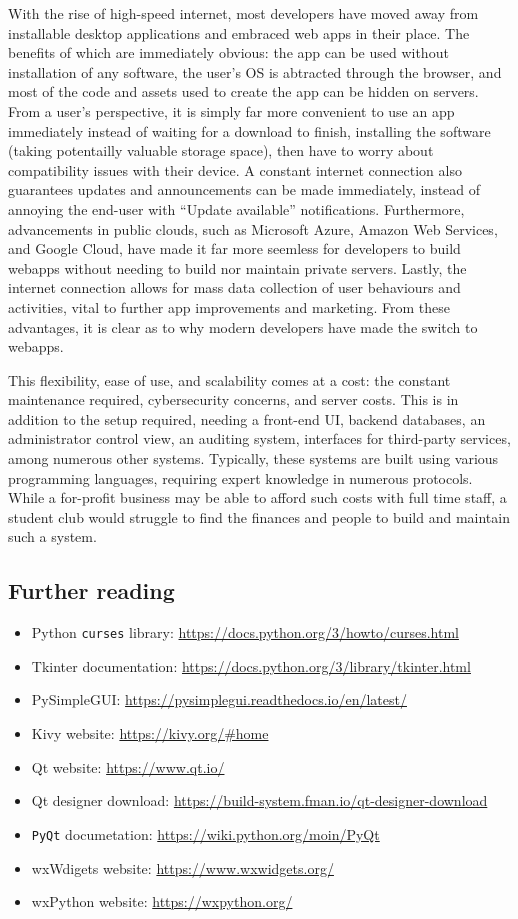 \documentclass[11pt]{article}
\begin{document}
With the rise of high-speed internet, most developers have moved away from installable desktop applications and embraced web apps in their place. The benefits of which are immediately obvious: the app can be used without installation of any software, the user's OS is abtracted through the browser, and most of the code and assets used to create the app can be hidden on servers. From a user's perspective, it is simply far more convenient to use an app immediately instead of waiting for a download to finish, installing the software (taking potentailly valuable storage space), then have to worry about compatibility issues with their device. A constant internet connection also guarantees updates and announcements can be made immediately, instead of annoying the end-user with ``Update available'' notifications. Furthermore, advancements in public clouds, such as Microsoft Azure, Amazon Web Services, and Google Cloud, have made it far more seemless for developers to build webapps without needing to build nor maintain private servers. Lastly, the internet connection allows for mass data collection of user behaviours and activities, vital to further app improvements and marketing. From these advantages, it is clear as to why modern developers have made the switch to webapps.

This flexibility, ease of use, and scalability comes at a cost: the constant maintenance required, cybersecurity concerns, and server costs. This is in addition to the setup required, needing a front-end UI, backend databases, an administrator control view, an auditing system, interfaces for third-party services, among numerous other systems. Typically, these systems are built using various programming languages, requiring expert knowledge in numerous protocols. While a for-profit business may be able to afford such costs with full time staff, a student club would struggle to find the finances and people to build and maintain such a system.

\subsection{Further reading}

\begin{itemize}
    \item Python \texttt{curses} library: \url{https://docs.python.org/3/howto/curses.html}
    \item Tkinter documentation: \url{https://docs.python.org/3/library/tkinter.html}
    \item PySimpleGUI: \url{https://pysimplegui.readthedocs.io/en/latest/}
    \item Kivy website: \url{https://kivy.org/#home}
    \item Qt website: \url{https://www.qt.io/}
    \item Qt designer download: \url{https://build-system.fman.io/qt-designer-download}
    \item \texttt{PyQt} documetation: \url{https://wiki.python.org/moin/PyQt}
    \item wxWdigets website: \url{https://www.wxwidgets.org/}
    \item wxPython website: \url{https://wxpython.org/}
\end{itemize}
\end{document}

